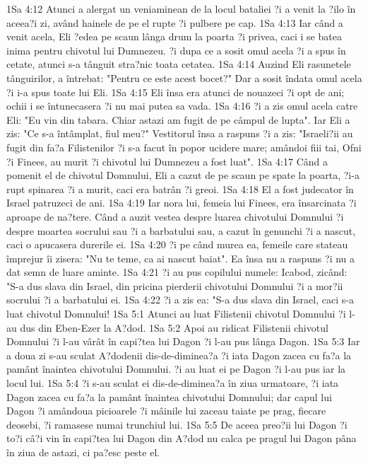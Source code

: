 1Sa 4:12  Atunci a alergat un veniaminean de la locul bataliei ?i a venit la ?ilo în aceea?i zi, având hainele de pe el rupte ?i pulbere pe cap.
1Sa 4:13  Iar când a venit acela, Eli ?edea pe scaun lânga drum la poarta ?i privea, caci i se batea inima pentru chivotul lui Dumnezeu. ?i dupa ce a sosit omul acela ?i a spus în cetate, atunci s-a tânguit stra?nic toata cetatea.
1Sa 4:14  Auzind Eli rasunetele tânguirilor, a întrebat: "Pentru ce este acest bocet?" Dar a sosit îndata omul acela ?i i-a spus toate lui Eli.
1Sa 4:15  Eli însa era atunci de nouazeci ?i opt de ani; ochii i se întunecasera ?i nu mai putea sa vada.
1Sa 4:16  ?i a zis omul acela catre Eli: "Eu vin din tabara. Chiar astazi am fugit de pe câmpul de lupta". Iar Eli a zis: "Ce s-a întâmplat, fiul meu?" Vestitorul însa a raspuns ?i a zis: "Israeli?ii au fugit din fa?a Filistenilor ?i s-a facut în popor ucidere mare; amândoi fiii tai, Ofni ?i Finees, au murit ?i chivotul lui Dumnezeu a fost luat".
1Sa 4:17  Când a pomenit el de chivotul Domnului, Eli a cazut de pe scaun pe spate la poarta, ?i-a rupt spinarea ?i a murit, caci era batrân ?i greoi.
1Sa 4:18  El a fost judecator în Israel patruzeci de ani.
1Sa 4:19  Iar nora lui, femeia lui Finees, era însarcinata ?i aproape de na?tere. Când a auzit vestea despre luarea chivotului Domnului ?i despre moartea socrului sau ?i a barbatului sau, a cazut în genunchi ?i a nascut, caci o apucasera durerile ei.
1Sa 4:20  ?i pe când murea ea, femeile care stateau împrejur îi zisera: "Nu te teme, ca ai nascut baiat". Ea însa nu a raspuns ?i nu a dat semn de luare aminte.
1Sa 4:21  ?i au pus copilului numele: Icabod, zicând: "S-a dus slava din Israel, din pricina pierderii chivotului Domnului ?i a mor?ii socrului ?i a barbatului ei.
1Sa 4:22  ?i a zis ea: "S-a dus slava din Israel, caci s-a luat chivotul Domnului!
1Sa 5:1  Atunci au luat Filistenii chivotul Domnului ?i l-au dus din Eben-Ezer la A?dod.
1Sa 5:2  Apoi au ridicat Filistenii chivotul Domnului ?i l-au vârât în capi?tea lui Dagon ?i l-au pus lânga Dagon.
1Sa 5:3  Iar a doua zi s-au sculat A?dodenii dis-de-diminea?a ?i iata Dagon zacea cu fa?a la pamânt înaintea chivotului Domnului. ?i au luat ei pe Dagon ?i l-au pus iar la locul lui.
1Sa 5:4  ?i s-au sculat ei dis-de-diminea?a în ziua urmatoare, ?i iata Dagon zacea cu fa?a la pamânt înaintea chivotului Domnului; dar capul lui Dagon ?i amândoua picioarele ?i mâinile lui zaceau taiate pe prag, fiecare deosebi, ?i ramasese numai trunchiul lui.
1Sa 5:5  De aceea preo?ii lui Dagon ?i to?i câ?i vin în capi?tea lui Dagon din A?dod nu calca pe pragul lui Dagon pâna în ziua de astazi, ci pa?esc peste el.
